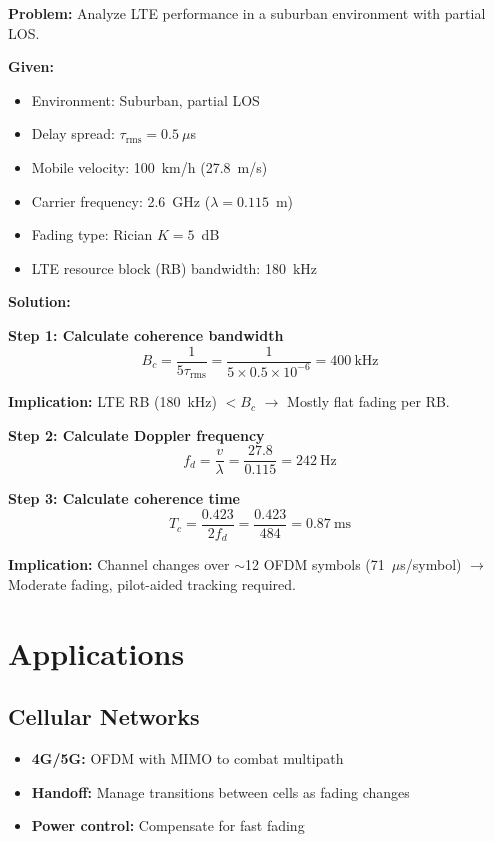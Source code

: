 \textbf{Problem:} Analyze LTE performance in a suburban environment with partial LOS.

\textbf{Given:}
\begin{itemize}
\item Environment: Suburban, partial LOS
\item Delay spread: $\tau_{\text{rms}} = 0.5~\mu$s
\item Mobile velocity: 100~km/h (27.8~m/s)
\item Carrier frequency: 2.6~GHz ($\lambda = 0.115$~m)
\item Fading type: Rician $K=5$~dB
\item LTE resource block (RB) bandwidth: 180~kHz
\end{itemize}

\textbf{Solution:}

\textbf{Step 1: Calculate coherence bandwidth}
\begin{equation*}
B_c = \frac{1}{5\tau_{\text{rms}}} = \frac{1}{5 \times 0.5 \times 10^{-6}} = 400~\text{kHz}
\end{equation*}

\textbf{Implication:} LTE RB (180~kHz) $< B_c$ $\rightarrow$ Mostly flat fading per RB.

\textbf{Step 2: Calculate Doppler frequency}
\begin{equation*}
f_d = \frac{v}{\lambda} = \frac{27.8}{0.115} = 242~\text{Hz}
\end{equation*}

\textbf{Step 3: Calculate coherence time}
\begin{equation*}
T_c = \frac{0.423}{2f_d} = \frac{0.423}{484} = 0.87~\text{ms}
\end{equation*}

\textbf{Implication:} Channel changes over $\sim$12 OFDM symbols (71~$\mu$s/symbol) $\rightarrow$ Moderate fading, pilot-aided tracking required.

\section{Applications}

\subsection{Cellular Networks}
\begin{itemize}
\item \textbf{4G/5G:} OFDM with MIMO to combat multipath
\item \textbf{Handoff:} Manage transitions between cells as fading changes
\item \textbf{Power control:} Compensate for fast fading
\end{itemize}

